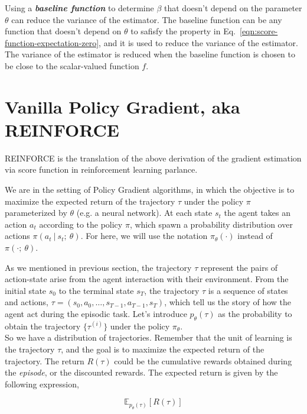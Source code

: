 Using a \textbf{\textit{baseline function}} to determine $\beta$ that doesn't
depend on the parameter $\theta$ can reduce the variance of the estimator. The
baseline function can be any function that doesn't depend on $\theta$ to
safisfy the property in Eq.~\ref{eqn:score-function-expectation-zero}, and it is used to reduce the variance of the estimator. The variance of the estimator is reduced when the baseline function is chosen to be close to the scalar-valued function $f$.

\section{Vanilla Policy Gradient, aka REINFORCE}

REINFORCE \citep{williams1992simple} is the translation of the above derivation
of the gradient estimation via score function in reinforcement learning 
parlance.

We are in the setting of Policy Gradient algorithms, in which the objective is
to maximize the expected return of the trajectory $\tau$ under the policy 
$\pi$ parameterized by $\theta$ (e.g. a neural network). At each state
$s_t$ the agent takes an action $a_t$ according to the policy $\pi$,
which spawn a probability distribution over actions $\pi(a_{t}~|~s_{t};~\theta)$. For here, we will use the notation $\pi_{\theta}(\cdot)$ instead of 
$\pi(\cdot;~\theta)$.

As we mentioned in previous section, the trajectory $\tau$ represent the
pairs of action-state arise from the agent interaction with their environment. 
From the initial state $s_{0}$ to the terminal state $s_{T}$, the trajectory
$\tau$ is a sequence of states and actions, $\tau = (s_{0}, a_{0}, \dots, s_{T-1}, a_{T-1}, s_{T})$, which tell us the story of how the agent
act during the episodic task. Let's introduce $p_{\theta}(\tau)$ as the
probability to obtain the trajectory $\{\tau^{(i)}\}$ under the policy $\pi_{\theta}$. \\

So we have a distribution of trajectories. Remember that the unit of learning
is the trajectory $\tau$, and the goal is to maximize the expected return of the
trajectory. The return $R(\tau)$ could be the cumulative rewards obtained during the \textit{episode}, or the discounted rewards. The expected return is given by the following expression,

\begin{equation}\label{eqn:rl-objective}
    \mathbb{E}_{p_{\theta}(\tau)}[R(\tau)] 
\end{equation}

